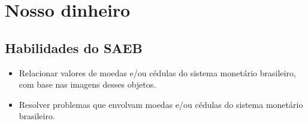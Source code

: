 \chapter{Nosso dinheiro}

\section{Habilidades do SAEB}

\begin{itemize}
\item Relacionar valores de moedas e/ou cédulas do sistema monetário
brasileiro, com base nas imagens desses objetos.

\item Resolver problemas que envolvam moedas e/ou cédulas do sistema
monetário brasileiro.
\end{itemize}

